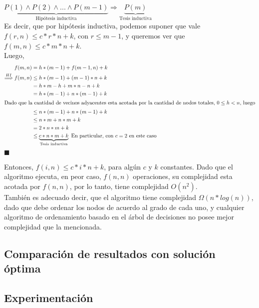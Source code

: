 $\underbrace{P(1) \wedge P(2) \wedge ... \wedge P(m-1)}_{\text{Hipótesis inductiva}} \Rightarrow \underbrace{P(m)}_{\text{Tesis inductiva}}$\\

Es decir, que por hipótesis inductiva, podemos suponer que vale $f(r,n) \leq c*r*n + k$, con $r \leq m-1$, y queremos ver que $f(m,n) \leq c*m*n + k$.\\
Luego,
\begin{align*}
f(m,n) & = h*(m-1) + f(m-1,n) + k \\
 \stackrel{HI}{\Longrightarrow} f(m,n) & \leq h*(m-1) + (m-1)*n + k \\
 & = h*m - h + m*n - n + k\\
 & = h*(m-1) + n*(m-1) + k\\
 \intertext{Dado que la cantidad de vecinos adyacentes esta acotada por la cantidad de nodos totales, $0 \leq h < n$, luego}
 & \leq n*(m-1)+n*(m-1) + k\\
 & \leq n*m + n*m + k\\
 & = 2*n*m + k\\
 & \leq \underbrace{c*n*m + k}_{\text{Tesis inductiva}} \text{       En particular, con $c = 2$ en este caso}
\end{align*}
\hfill $\blacksquare$

Entonces, $f(i,n) \leq c*i*n + k$, para algún $c$ y $k$ constantes.
Dado que el algoritmo ejecuta, en peor caso, $f(n,n)$ operaciones, su complejidad esta acotada por $f(n,n)$, por lo tanto, tiene complejidad $O(n^{2})$.\\

También es adecuado decir, que el algoritmo tiene complejidad $\Omega(n*log(n))$, dado que debe ordenar los nodos de acuerdo al grado de cada uno, y cualquier algoritmo de ordenamiento basado en el árbol de decisiones no posee mejor complejidad que la mencionada.

\subsection{Comparaci\'on de resultados con soluci\'on \'optima}
\subsection{Experimentaci\'on}

